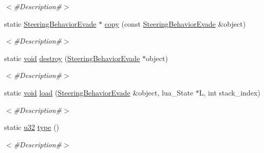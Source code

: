 \begin{DoxyCompactItemize}
\begin{DoxyCompactList}\small\item\em $<$\#\+Description\#$>$ \end{DoxyCompactList}\item 
static \mbox{\hyperlink{classnjli_1_1_steering_behavior_evade}{Steering\+Behavior\+Evade}} $\ast$ \mbox{\hyperlink{classnjli_1_1_steering_behavior_evade_a8795aeeb2da4b641b3cab466a569c689}{copy}} (const \mbox{\hyperlink{classnjli_1_1_steering_behavior_evade}{Steering\+Behavior\+Evade}} \&object)
\begin{DoxyCompactList}\small\item\em $<$\#\+Description\#$>$ \end{DoxyCompactList}\item 
static \mbox{\hyperlink{_thread_8h_af1e856da2e658414cb2456cb6f7ebc66}{void}} \mbox{\hyperlink{classnjli_1_1_steering_behavior_evade_a400007cd35f6b4be2c777078c27cf7dc}{destroy}} (\mbox{\hyperlink{classnjli_1_1_steering_behavior_evade}{Steering\+Behavior\+Evade}} $\ast$object)
\begin{DoxyCompactList}\small\item\em $<$\#\+Description\#$>$ \end{DoxyCompactList}\item 
static \mbox{\hyperlink{_thread_8h_af1e856da2e658414cb2456cb6f7ebc66}{void}} \mbox{\hyperlink{classnjli_1_1_steering_behavior_evade_ac63d609bdeaf72751db55113f8928ffc}{load}} (\mbox{\hyperlink{classnjli_1_1_steering_behavior_evade}{Steering\+Behavior\+Evade}} \&object, lua\+\_\+\+State $\ast$L, int stack\+\_\+index)
\begin{DoxyCompactList}\small\item\em $<$\#\+Description\#$>$ \end{DoxyCompactList}\item 
static \mbox{\hyperlink{_util_8h_a10e94b422ef0c20dcdec20d31a1f5049}{u32}} \mbox{\hyperlink{classnjli_1_1_steering_behavior_evade_ae3512120b3fa30c75371f54e1a450ebf}{type}} ()
\begin{DoxyCompactList}\small\item\em $<$\#\+Description\#$>$ \end{DoxyCompactList}\end{DoxyCompactItemize}
